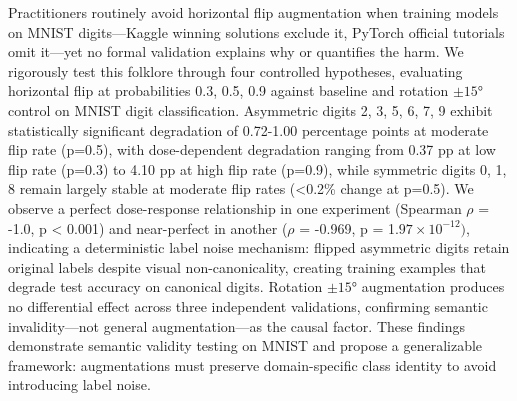 
Practitioners routinely avoid horizontal flip augmentation when training models on MNIST digits---Kaggle winning solutions exclude it, PyTorch official tutorials omit it---yet no formal validation explains why or quantifies the harm. We rigorously test this folklore through four controlled hypotheses, evaluating horizontal flip at probabilities {0.3, 0.5, 0.9} against baseline and rotation $\pm 15$° control on MNIST digit classification. Asymmetric digits {2, 3, 5, 6, 7, 9} exhibit statistically significant degradation of 0.72-1.00 percentage points at moderate flip rate (p=0.5), with dose-dependent degradation ranging from 0.37 pp at low flip rate (p=0.3) to 4.10 pp at high flip rate (p=0.9), while symmetric digits {0, 1, 8} remain largely stable at moderate flip rates (<0.2\% change at p=0.5). We observe a perfect dose-response relationship in one experiment (Spearman $\rho$ = -1.0, p < 0.001) and near-perfect in another ($\rho$ = -0.969, p = 1.$97\times 10^{-12})$, indicating a deterministic label noise mechanism: flipped asymmetric digits retain original labels despite visual non-canonicality, creating training examples that degrade test accuracy on canonical digits. Rotation $\pm 15$° augmentation produces no differential effect across three independent validations, confirming semantic invalidity---not general augmentation---as the causal factor. These findings demonstrate semantic validity testing on MNIST and propose a generalizable framework: augmentations must preserve domain-specific class identity to avoid introducing label noise.

